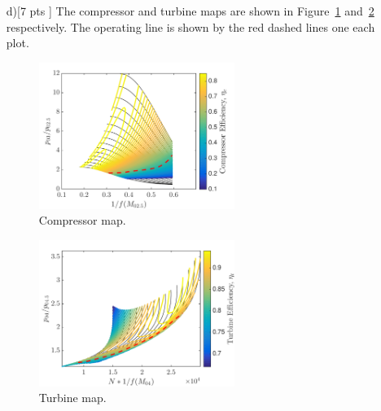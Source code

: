\documentclass[12pt]{article}
\begin{document}
\begin{itemize}
	\item[d)[7 pts]]
	The compressor and turbine maps are shown in Figure~\ref{fig:p4d1} and~\ref{fig:p4d2} respectively. The operating line is shown by the red dashed lines one each plot.
	\begin{figure}[H]
		\centering
		\includegraphics[width=0.6\textwidth]{p4d1}
		\caption{Compressor map.}
		\label{fig:p4d1}
	\end{figure}
		
	\begin{figure}[H]
		\centering
		\includegraphics[width=0.6\textwidth]{p4d2}
		\caption{Turbine map.}
		\label{fig:p4d2}
	\end{figure}
	
\end{itemize}
\end{document}
